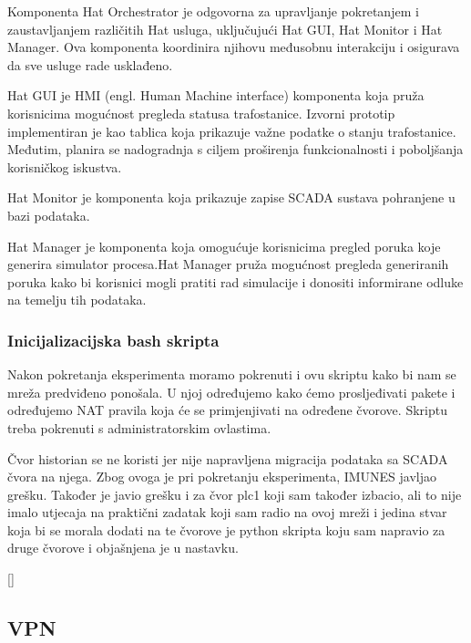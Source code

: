 \documentclass[times, utf8, zavrsni]{fer}
\begin{document}
Komponenta Hat Orchestrator je odgovorna za upravljanje pokretanjem i zaustavljanjem različitih Hat usluga, uključujući Hat GUI, Hat Monitor i Hat Manager. Ova komponenta koordinira njihovu međusobnu interakciju i osigurava da sve usluge rade usklađeno.

Hat GUI je HMI (engl. Human Machine interface) komponenta koja pruža korisnicima mogućnost pregleda statusa trafostanice. Izvorni prototip implementiran je kao tablica koja prikazuje važne podatke o stanju trafostanice. Međutim, planira se nadogradnja s ciljem proširenja funkcionalnosti i poboljšanja korisničkog iskustva.

Hat Monitor je komponenta koja prikazuje zapise SCADA sustava pohranjene u bazi podataka.

Hat Manager je komponenta koja omogućuje korisnicima pregled poruka koje generira simulator procesa.Hat Manager pruža mogućnost pregleda generiranih poruka kako bi korisnici mogli pratiti rad simulacije i donositi informirane odluke na temelju tih podataka.

\subsubsection{Inicijalizacijska bash skripta}
Nakon pokretanja eksperimenta moramo pokrenuti i ovu skriptu kako bi nam se mreža predviđeno ponošala. U njoj određujemo kako ćemo prosljeđivati pakete i određujemo NAT pravila koja će se primjenjivati na određene čvorove. Skriptu treba pokrenuti s administratorskim ovlastima.

Čvor historian se ne koristi jer nije napravljena migracija podataka sa SCADA čvora na njega. Zbog ovoga je pri pokretanju eksperimenta, IMUNES javljao grešku. Također je javio grešku i za čvor plc1 koji sam također izbacio, ali to nije imalo utjecaja na praktični zadatak koji sam radio na ovoj mreži i jedina stvar koja bi se morala dodati na te čvorove je python skripta koju sam napravio za druge čvorove i objašnjena je u nastavku.

[\cite{our-hp}]

\subsection{VPN}
\end{document}
